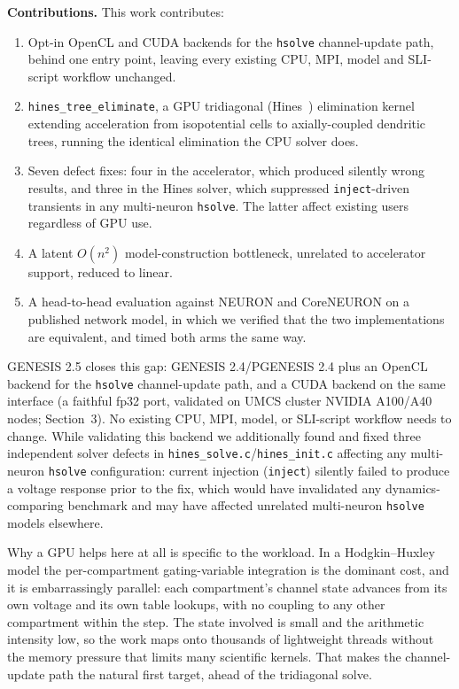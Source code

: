 \documentclass[preprint,12pt, a4paper]{elsarticle}
\newcommand{\hte}{\texttt{hines\_\allowbreak tree\_\allowbreak eliminate}}
\begin{document}
\begin{enumerate}
\textbf{Contributions.} This work contributes:

\begin{enumerate}
\item Opt-in OpenCL and CUDA backends for the \texttt{hsolve} channel-update path, behind one entry point, leaving every existing CPU, MPI, model and SLI-script workflow unchanged.
\item \hte{}, a GPU tridiagonal (Hines~\cite{hines1984efficient}) elimination kernel extending acceleration from isopotential cells to axially-coupled dendritic trees, running the identical elimination the CPU solver does.
\item Seven defect fixes: four in the accelerator, which produced silently wrong results, and three in the Hines solver, which suppressed \texttt{inject}-driven transients in any multi-neuron \texttt{hsolve}. The latter affect existing users regardless of GPU use.
\item A latent $O(n^2)$ model-construction bottleneck, unrelated to accelerator support, reduced to linear.
\item A head-to-head evaluation against NEURON and CoreNEURON on a published network model, in which we verified that the two implementations are equivalent, and timed both arms the same way.
\end{enumerate}

GENESIS 2.5 closes this gap: GENESIS 2.4/PGENESIS 2.4 plus an OpenCL backend for the \texttt{hsolve} channel-update path, and a CUDA backend on the same interface (a faithful fp32 port, validated on UMCS cluster NVIDIA A100/A40 nodes; Section~3). No existing CPU, MPI, model, or SLI-script workflow needs to change. While validating this backend we additionally found and fixed three independent solver defects in \texttt{hines\_solve.c}/\texttt{hines\_init.c} affecting any multi-neuron \texttt{hsolve} configuration: current injection (\texttt{inject}) silently failed to produce a voltage response prior to the fix, which would have invalidated any dynamics-comparing benchmark and may have affected unrelated multi-neuron \texttt{hsolve} models elsewhere.

Why a GPU helps here at all is specific to the workload. In a Hodgkin--Huxley model the per-compartment gating-variable integration is the dominant cost, and it is embarrassingly parallel: each compartment's channel state advances from its own voltage and its own table lookups, with no coupling to any other compartment within the step. The state involved is small and the arithmetic intensity low, so the work maps onto thousands of lightweight threads without the memory pressure that limits many scientific kernels. That makes the channel-update path the natural first target, ahead of the tridiagonal solve.


\end{enumerate}
\end{document}
